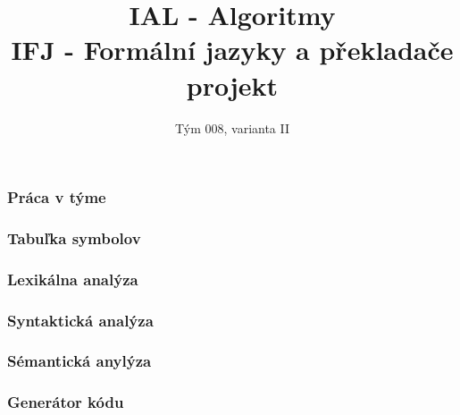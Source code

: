 \documentclass[usenames,dvipsnames]{beamer}
\title{IAL - Algoritmy \\
IFJ - Formální jazyky a překladače \\
projekt}
\subtitle{Tým 008, varianta II}
\date{}
\begin{document}
\begin{frame}
\maketitle
\begin{table}[H]
	\Large
	\centering
\end{table}
\end{frame}

\begin{frame}
	\frametitle{Práca v týme}
\end{frame}

\begin{frame}
	\frametitle{Tabuľka symbolov}
\end{frame}

\begin{frame}
	\frametitle{Lexikálna analýza}

\end{frame}
%	
\begin{frame}
	\frametitle{Syntaktická analýza}

\end{frame}
%
\begin{frame}
	\frametitle{Sémantická anylýza}

\end{frame}
%
\begin{frame}
	\frametitle{Generátor kódu}

\end{frame}
\end{document}
